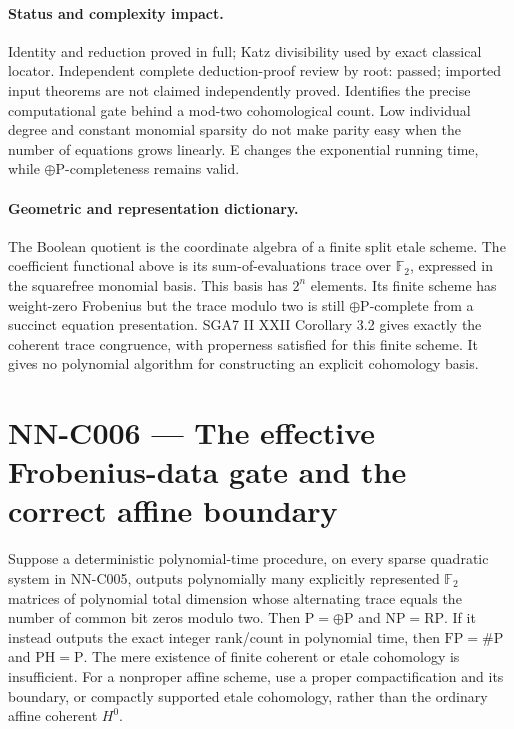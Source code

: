 \paragraph{Status and complexity impact.}
Identity and reduction proved in full; Katz divisibility used by exact classical locator. Independent complete deduction-proof review by root: passed; imported input theorems are not claimed independently proved. Identifies the precise computational gate behind a mod-two cohomological count. Low individual degree and constant monomial sparsity do not make parity easy when the number of equations grows linearly. E changes the exponential running time, while $\oplus\mathrm P$-completeness remains valid.

\paragraph{Geometric and representation dictionary.}
The Boolean quotient is the coordinate algebra of a finite split etale scheme. The coefficient functional above is its sum-of-evaluations trace over $\mathbb F_2$, expressed in the squarefree monomial basis. This basis has $2^n$ elements. Its finite scheme has weight-zero Frobenius but the trace modulo two is still $\oplus\mathrm P$-complete from a succinct equation presentation. SGA7 II XXII Corollary 3.2 gives exactly the coherent trace congruence, with properness satisfied for this finite scheme. It gives no polynomial algorithm for constructing an explicit cohomology basis.



\section{NN-C006 --- The effective Frobenius-data gate and the correct affine boundary}
\begin{proposition}[NN-C006]
Suppose a deterministic polynomial-time procedure, on every sparse quadratic system in NN-C005, outputs polynomially many explicitly represented $\mathbb F_2$ matrices of polynomial total dimension whose alternating trace equals the number of common bit zeros modulo two. Then $\mathrm P=\oplus\mathrm P$ and $\mathrm{NP}=\mathrm{RP}$. If it instead outputs the exact integer rank/count in polynomial time, then $\mathrm{FP}=\#\mathrm P$ and $\mathrm{PH}=\mathrm P$. The mere existence of finite coherent or etale cohomology is insufficient. For a nonproper affine scheme, use a proper compactification and its boundary, or compactly supported etale cohomology, rather than the ordinary affine coherent $H^0$.
\end{proposition}
